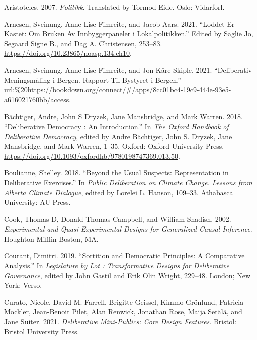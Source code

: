 \documentclass[
  12pt,
  a4paper, 12pt]{article}
\newlength{\cslhangindent}
\newlength{\cslentryspacingunit} %
\newenvironment{CSLReferences}[2] %
 {%
  \setlength{\parindent}{0pt}
  \ifodd #1
  \let\oldpar\par
  \def\par{\hangindent=\cslhangindent\oldpar}
  \fi
  \setlength{\parskip}{#2\cslentryspacingunit}
 }%
 {}
\begin{document}
\hypertarget{refs}{}
\begin{CSLReferences}{1}{0}
\leavevmode{}%
Aristoteles. 2007. \emph{Politikk}. Translated by Tormod Eide. Oslo: Vidarforl.

\leavevmode{}%
Arnesen, Sveinung, Anne Lise Fimreite, and Jacob Aars. 2021. {``Loddet Er Kastet: Om Bruken Av Innbyggerpaneler i Lokalpolitikken.''} Edited by Saglie Jo, Segaard Signe B., and Dag A. Christensen, 253--83. \url{https://doi.org/10.23865/noasp.134.ch10}.

\leavevmode{}%
Arnesen, Sveinung, Anne Lise Fimreite, and Jon Kåre Skiple. 2021. {``Deliberativ Meningsmåling i Bergen. Rapport Til Bystyret i Bergen.''} \url{url:\%20https://bookdown.org/connect/\#/apps/8cc01bc4-19c9-444e-93e5-a616021760bb/access}.

\leavevmode{}%
Bächtiger, Andre, John S Dryzek, Jane Mansbridge, and Mark Warren. 2018. {``Deliberative {Democracy} : {An} {Introduction}.''} In \emph{The {Oxford} {Handbook} of {Deliberative} {Democracy}}, edited by Andre Bächtiger, John S. Dryzek, Jane Mansbridge, and Mark Warren, 1--35. Oxford: Oxford University Press. \url{https://doi.org/10.1093/oxfordhb/9780198747369.013.50}.

\leavevmode{}%
Boulianne, Shelley. 2018. {``Beyond the {Usual} {Suspects}: {Representation} in {Deliberative} {Exercises}.''} In \emph{Public {Deliberation} on {Climate} {Change}. {Lessons} from {Alberta} {Climate} {Dialogue}}, edited by Lorelei L. Hanson, 109--33. Athabasca University: AU Press.

\leavevmode{}%
Cook, Thomas D, Donald Thomas Campbell, and William Shadish. 2002. \emph{Experimental and Quasi-Experimental Designs for Generalized Causal Inference}. Houghton Mifflin Boston, MA.

\leavevmode{}%
Courant, Dimitri. 2019. {``Sortition and {Democratic} {Principles}: {A} {Comparative} {Analysis}.''} In \emph{Legislature by {Lot} : Transformative Designs for Deliberative Governance}, edited by John Gastil and Erik Olin Wright, 229--48. London; New York: Verso.

\leavevmode{}%
Curato, Nicole, David M. Farrell, Brigitte Geissel, Kimmo Grönlund, Patricia Mockler, Jean-Benoit Pilet, Alan Renwick, Jonathan Rose, Maija Setälä, and Jane Suiter. 2021. \emph{Deliberative {Mini}-{Publics}: {Core} {Design} {Features}}. Bristol: Bristol University Press.


\end{CSLReferences}
\end{document}

